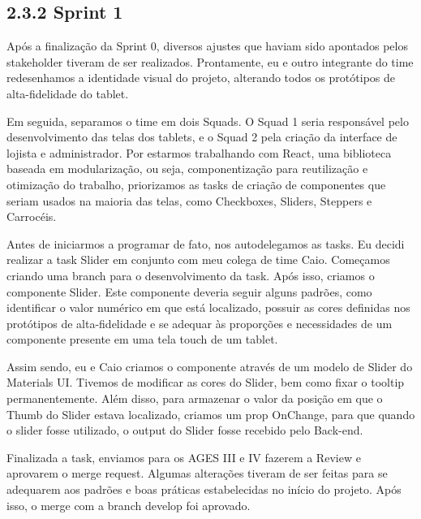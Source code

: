 \hypertarget{__RefHeading___Toc4745_3118176633}{}
\subsection*{2.3.2 Sprint 1}
\label{unit:ages-i-sprint-1}

\indent \originaltab{}Após a finalização da Sprint 0, diversos ajustes que haviam sido apontados pelos stakeholder tiveram de ser realizados. Prontamente, eu e outro integrante do time redesenhamos a identidade visual do projeto, alterando todos os protótipos de alta-fidelidade do tablet.\originalspace{}

\indent \originaltab{}Em seguida, separamos o time em dois Squads. O Squad 1 seria responsável pelo desenvolvimento das telas dos tablets, e o Squad 2 pela criação da interface de lojista e administrador. Por estarmos trabalhando com React, uma biblioteca baseada em modularização, ou seja, componentização para reutilização e otimização do trabalho, priorizamos as tasks de criação de componentes que seriam usados na maioria das telas, como Checkboxes, Sliders, Steppers e Carrocéis.\originalspace{}

\indent \originaltab{}Antes de iniciarmos a programar de fato, nos autodelegamos as tasks. Eu decidi realizar a task Slider em conjunto com meu colega de time Caio. Começamos criando uma branch para o desenvolvimento da task. Após isso, criamos o componente Slider. Este componente deveria seguir alguns padrões, como identificar o valor numérico em que está localizado, possuir as cores definidas nos protótipos de alta-fidelidade e se adequar às proporções e necessidades de um componente presente em uma tela touch de um tablet.

\indent \originaltab{}Assim sendo, eu e Caio criamos o componente através de um modelo de Slider do Materials UI. Tivemos de modificar as cores do Slider, bem como fixar o tooltip permanentemente. Além disso, para armazenar o valor da posição em que o Thumb do Slider estava localizado, criamos um prop OnChange, para que quando o slider fosse utilizado, o output do Slider fosse recebido pelo Back-end.

\indent \originaltab{}Finalizada a task, enviamos para os AGES III e IV fazerem a Review e aprovarem o merge request. Algumas alterações tiveram de ser feitas para se adequarem aos padrões e boas práticas estabelecidas no início do projeto. Após isso, o merge com a branch develop foi aprovado.

